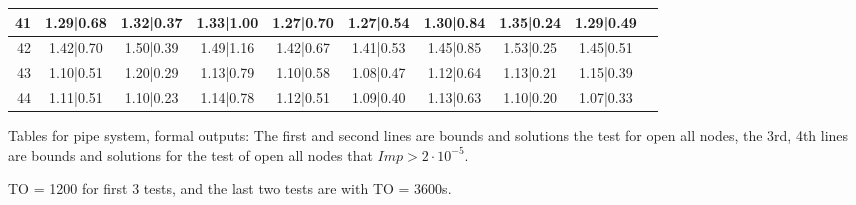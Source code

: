 \begin{table}
\begin{tabular}{|r||c|c|c|c|c|c|c|c|c|}
41 &1.29|0.68 &1.32|0.37 &1.33|1.00 &1.27|0.70 &1.27|0.54 &1.30|0.84 &1.35|0.24 &1.29|0.49 &  \\\hline
42 &1.42|0.70 &1.50|0.39 &1.49|1.16 &1.42|0.67 &1.41|0.53 &1.45|0.85 &1.53|0.25 &1.45|0.51 &  \\\hline
43 &1.10|0.51 &1.20|0.29 &1.13|0.79 &1.10|0.58 &1.08|0.47 &1.12|0.64 &1.13|0.21 &1.15|0.39 &  \\\hline
44 &1.11|0.51 &1.10|0.23 &1.14|0.78 &1.12|0.51 &1.09|0.40 &1.13|0.63 &1.10|0.20 &1.07|0.33 &  \\\hline
	\end{tabular}
\end{table}

\clearpage

Tables for pipe system, formal outputs: The first and second lines are bounds and solutions the test for open all nodes, the 3rd, 4th lines are bounds and solutions for the test of open all nodes that $Imp > 2\cdot10^{-5}$.

TO = 1200 for first 3 tests, and the last two tests are with TO = 3600s.



